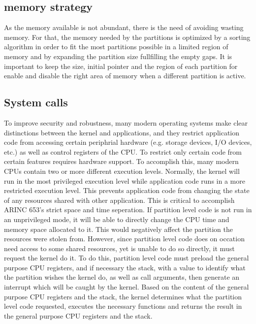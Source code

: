 \subsection{memory strategy}
As the memory available is not abundant, there is the need of avoiding wasting memory. For that, the memory needed by the partitions is optimized by a sorting algorithm in order to fit 
the most partitions possible in a limited region of memory and by expanding the partition size fullfilling 
the empty gaps. It is important to keep the size, initial pointer and the region of each partition for enable and disable the right area of memory when a different partition is active.

\subsection{System calls}
\label{ssec:design_system_calls}
To improve security and robustness, many modern operating systems make clear 
distinctions between the kernel and applications, and they restrict application
code from accessing certain periphrial hardware (e.g. storage devices, I/O
devices, etc.) as well as control registers of the CPU. 
To restrict only certain code from certain features requires hardware support.
To accomplish this, many modern CPUs contain two or more different execution
levels. Normally, the kernel will run in the most privileged execution level
while application code runs in a more restricted execution level. This prevents
application code from changing the state of any resources shared with other
application. This is critical to accomplish ARINC 653's strict space and time 
seperation. If partition level code is not run in an unprivileged mode, it will
be able to directly change the CPU time and memory space allocated to it. This
would negatively affect the partition the resources were stolen from. However,
since partition level code does on occation need access to some shared resources,
yet is unable to do so directly, it must request the kernel do it. To do this,
partition level code must preload the general purpose CPU registers, and if
necessary the stack, with a value to identify what the partition wishes the
kernel do, as well as call arguments, then generate an interrupt which will be
caught by the kernel. Based on the content of the general purpose CPU registers
and the stack, the kernel determines what the partition level code requested,
executes the necessary functions and returns the result in the general purpose 
CPU registers and the stack.

